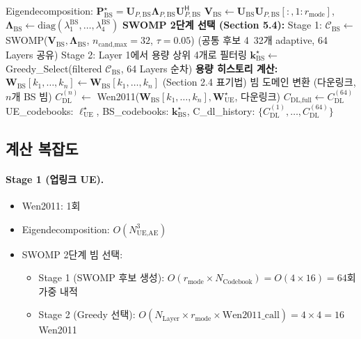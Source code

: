 \documentclass[10pt]{article}
\begin{document}
\begin{algorithm}[H]
\begin{algorithmic}[1]
\STATE Eigendecomposition: $\mathbf{P}_{\text{BS}}^{\star} = \mathbf{U}_{P,\text{BS}} \boldsymbol{\Lambda}_{P,\text{BS}} \mathbf{U}_{P,\text{BS}}^{\mathsf{H}}$
\STATE $\mathbf{V}_{\text{BS}} \gets \mathbf{U}_{\text{BS}} \mathbf{U}_{P,\text{BS}}[:, 1:r_{\text{mode}}]$, $\boldsymbol{\Lambda}_{\text{BS}} \gets \text{diag}(\lambda_1^{\text{BS}}, \ldots, \lambda_4^{\text{BS}})$
\STATE \textbf{SWOMP 2단계 선택 (Section 5.4):}
\STATE \quad Stage 1: $\mathcal{C}_{\text{BS}} \gets$ SWOMP($\mathbf{V}_{\text{BS}}, \boldsymbol{\Lambda}_{\text{BS}}$, $n_{\text{cand,max}}=32$, $\tau=0.05$)
\STATE \quad\quad\quad (공통 후보 4~32개 adaptive, 64 Layers 공유)
\STATE \quad Stage 2: Layer 1에서 용량 상위 4개로 필터링
\STATE \quad\quad\quad $\boldsymbol{k}_{\text{BS}}^{\star} \gets$ Greedy\_Select(filtered $\mathcal{C}_{\text{BS}}$, 64 Layers 순차)
\STATE
\STATE \textbf{용량 히스토리 계산:}
    \STATE $\mathbf{W}_{\text{BS}}[k_1, \ldots, k_n] \gets \mathbf{W}_{\text{BS}}[k_1, \ldots, k_n]$ (Section 2.4 표기법)
    \STATE 빔 도메인 변환 (다운링크, $n$개 BS 빔)
    \STATE $C_{\text{DL}}^{(n)} \gets$ Wen2011($\mathbf{W}_{\text{BS}}[k_1, \ldots, k_n], \mathbf{W}_{\text{UE}}^{\star}$, 다운링크)
\ENDFOR
\STATE $C_{\text{DL,full}} \gets C_{\text{DL}}^{(64)}$
\STATE
\RETURN UE\_codebooks: $\boldsymbol{\ell}_{\text{UE}}^{\star}$, BS\_codebooks: $\boldsymbol{k}_{\text{BS}}^{\star}$, C\_dl\_history: $\{C_{\text{DL}}^{(1)}, \ldots, C_{\text{DL}}^{(64)}\}$
\end{algorithmic}
\end{algorithm}

\subsection{계산 복잡도}

\paragraph{Stage 1 (업링크 UE).}
\begin{itemize}
    \item Wen2011: 1회
    \item Eigendecomposition: $O(N_{\text{UE,AE}}^3)$
    \item SWOMP 2단계 빔 선택:
    \begin{itemize}
        \item Stage 1 (SWOMP 후보 생성): $O(r_{\text{mode}} \times N_{\text{Codebook}}) = O(4 \times 16) = 64$회 가중 내적
        \item Stage 2 (Greedy 선택): $O(N_{\text{Layer}} \times r_{\text{mode}} \times \text{Wen2011\_call}) = 4 \times 4 = 16$ Wen2011
    \end{itemize}
\end{itemize}
\end{document}
